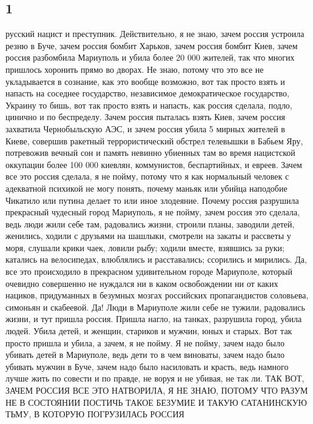  
 
 
 
 

\subsection{1}

русский нацист и преступник. Действительно, я не знаю, зачем
россия устроила резню в Буче, зачем россия бомбит Харьков, зачем россия бомбит
Киев, зачем россия разбомбила Мариуполь и убила более 20 000 жителей, так что
многих пришлось хоронить прямо во дворах. Не знаю, потому что это все не
укладывается в сознание, как это вообще возможно, вот так просто взять и
напасть на соседнее государство, независимое демократическое государство,
Украину то бишь, вот так просто взять и напасть, как россия сделала, подло,
цинично и по беспределу.  Зачем россия пыталась взять Киев, зачем россия
захватила Чернобыльскую АЭС, и зачем россия убила 5 мирных жителей в Киеве,
совершив ракетный террористический обстрел телевышки в Бабьем Яру, потревожив
вечный сон и память невинно убиенных там во время нацистской оккупации более
100 000 киевлян, коммунистов, беспартийных, и евреев. Зачем все это россия
сделала, я не пойму, потому что я как нормальный человек с адекватной психикой
не могу понять, почему маньяк или убийца наподобие Чикатило или путина делает
то или иное злодеяние.  Почему россия разрушила прекрасный чудесный город
Мариуполь, я не пойму, зачем россия это сделала, ведь люди жили себе там,
радовались жизни, строили планы, заводили детей, женились, ходили с друзьями на
шашлыки, смотрели на закаты и рассветы у моря, слушали крики чаек, ловили рыбу;
ходили вместе, взявшись за руки; катались на велосипедах, влюблялись и
расставались; ссорились и мирились. Да, все это происходило в прекрасном
удивительном городе Мариуполе, который очевидно совершенно не нуждался ни в
каком освобождении ни от каких нациков, придуманных в безумных мозгах
российских пропагандистов соловьева, симоньян и скабеевой. Да! Люди в Мариуполе
жили себе не тужили, радовались жизни, и тут пришла россия. Пришла нагло, на
танках, разрушила город, убила людей. Убила детей, и женщин, стариков и мужчин,
юных и старых. Вот так просто пришла и убила, а зачем, я не пойму. Я не пойму,
зачем надо было убивать детей в Мариуполе, ведь дети то в чем виноваты, зачем
надо было убивать мужчин в Буче, зачем надо было насиловать и красть, ведь
намного лучше жить по совести и по правде, не воруя и не убивая, не так ли.
ТАК ВОТ, ЗАЧЕМ РОССИЯ ВСЕ ЭТО НАТВОРИЛА, Я НЕ ЗНАЮ, ПОТОМУ ЧТО РАЗУМ НЕ В
СОСТОЯНИИ ПОСТИЧЬ ТАКОЕ БЕЗУМИЕ И ТАКУЮ САТАНИНСКУЮ ТЬМУ, В КОТОРУЮ ПОГРУЗИЛАСЬ
РОССИЯ
